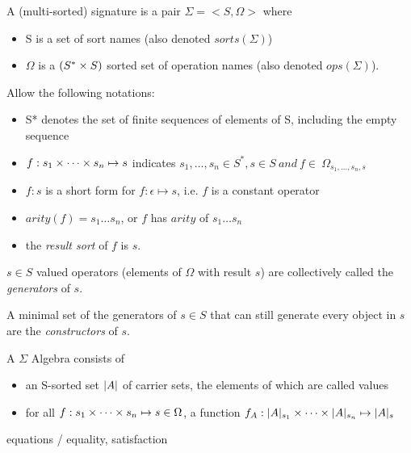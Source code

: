 \begin{df}[Signature]
A (multi-sorted) signature is a pair $\Sigma = <S,\Omega>$ where
\begin{itemize}
\item S is a set of sort names (also denoted $sorts(\Sigma)$)
\item $\Omega$ is a $(S^* \times S)$ sorted set of operation names (also denoted $ops(\Sigma)$).
\end{itemize}
Allow the following notations:
\begin{itemize}
\item S* denotes the set of finite sequences of elements of S, including the empty sequence
\item $f: s_1 \times \cdots \times s_n \mapsto s$ indicates 
$s_1,\ldots,s_n \in S^*, s \in S\ and\ f \in \ \Omega_{s_1,\ldots,s_n,s}$
\item $f:s$ is a short form for $f:\epsilon \mapsto s$, i.e. $f$ is a constant operator
\item $arity(f) = s_1\ldots s_n$, or $f$ has $arity$ of $s_1\ldots s_n$
\item the \emph{result sort} of $f$ is $s$.
\end{itemize}

\end{df}

\begin{df}[Generators]
$s \in S$ valued operators (elements of $\Omega$ with result $s$) are 
collectively called the \emph{generators} of $s$.
\end{df}

\begin{df}[Constructors]
A minimal set of the generators of $s \in S$
that can still generate every object in $s$ are the \emph{constructors} of $s$.
\end{df}

\begin{df}
A $\Sigma$ Algebra consists of
\begin{itemize}
\item an S-sorted set $\lvert A\rvert$ of carrier sets, the elements of which are called values
\item for all $f: s_1 \times \cdots \times s_n \mapsto s \in \Omega$, a function
$f_A: \lvert A\rvert_{s_1} \times \cdots \times  \lvert A\rvert_{s_n} \mapsto \lvert A\rvert_s$ 
\end{itemize}
\end{df}

equations / equality, satisfaction

